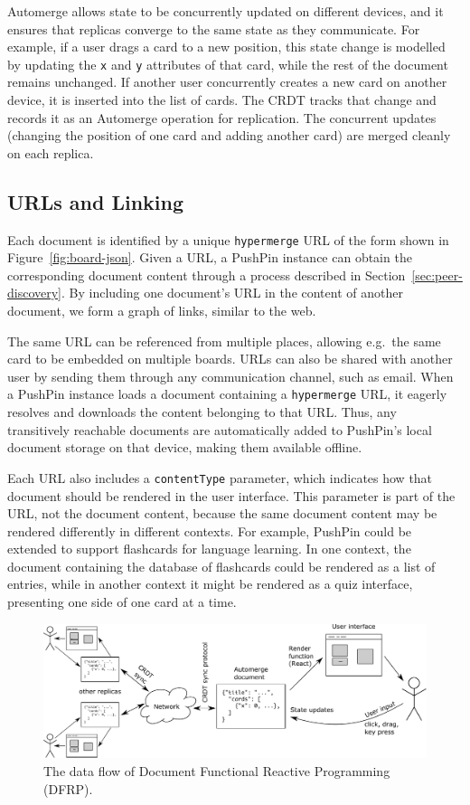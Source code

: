\documentclass[sigplan,10pt]{acmart}
\begin{document}
Automerge allows state to be concurrently updated on different devices, and it ensures that replicas converge to the same state as they communicate.
For example, if a user drags a card to a new position, this state change is modelled by updating the \texttt{x} and \texttt{y} attributes of that card, while the rest of the document remains unchanged.
If another user concurrently creates a new card on another device, it is inserted into the list of cards.
The CRDT tracks that change and records it as an Automerge operation for replication.
The concurrent updates (changing the position of one card and adding another card) are merged cleanly on each replica.

\subsection{URLs and Linking}\label{sec:urls}

Each document is identified by a unique \texttt{hypermerge} URL of the form shown in Figure~\ref{fig:board-json}.
Given a URL, a PushPin instance can obtain the corresponding document content through a process described in Section~\ref{sec:peer-discovery}.
By including one document's URL in the content of another document, we form a graph of links, similar to the web.

The same URL can be referenced from multiple places, allowing e.g.\ the same card to be embedded on multiple boards.
URLs can also be shared with another user by sending them through any communication channel, such as email.
When a PushPin instance loads a document containing a \texttt{hypermerge} URL, it eagerly resolves and downloads the content belonging to that URL.
Thus, any transitively reachable documents are automatically added to PushPin's local document storage on that device, making them available offline.

Each URL also includes a \texttt{contentType} parameter, which indicates how that document should be rendered in the user interface.
This parameter is part of the URL, not the document content, because the same document content may be rendered differently in different contexts.
For example, PushPin could be extended to support flashcards for language learning.
In one context, the document containing the database of flashcards could be rendered as a list of entries, while in another context it might be rendered as a quiz interface, presenting one side of one card at a time.

\begin{figure}
\centering
\includegraphics{document-frp.pdf}
\caption{The data flow of Document Functional Reactive Programming (DFRP).}
\label{fig:document-frp}
\end{figure}
\end{document}
